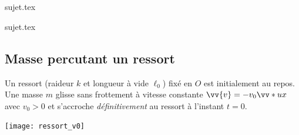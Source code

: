 \documentclass[a4paper, 12pt, final, garamond]{book}
\begin{document}
\setcounter{chapter}{3}

\renewcommand{\f}[2]{{
		\mathchoice
		{\dfrac{#1}{#2}}
		{\dfrac{#1}{#2}}
		{\frac{#1}{#2}}
		{\frac{#1}{#2}}
}}

\newcommand{\e}[1]{{}_{\text{#1}}}

\toggletrue{corrige}  %

\resetQ
\chapter{}

\resetQ
{sujet.tex}

\resetQ
{sujet.tex}

\resetQ
\section{Masse percutant un ressort}

\begin{minipage}{0.70\linewidth}

    Un ressort (raideur $k$ et longueur à vide $\ell_0$) fixé en $O$ est initialement au
    repos. Une masse $m$ glisse sans frottement à vitesse constante $\vv{v} =
    -v_0\vv*{u}{x}$ avec $v_0 > 0$
    et s'accroche \textit{définitivement} au ressort à l'instant $t = 0$.
\end{minipage}
\hfill
\begin{minipage}{0.3\linewidth}
    \centering
    \texttt{[image: ressort\_v0]}
\end{minipage}
\end{document}
